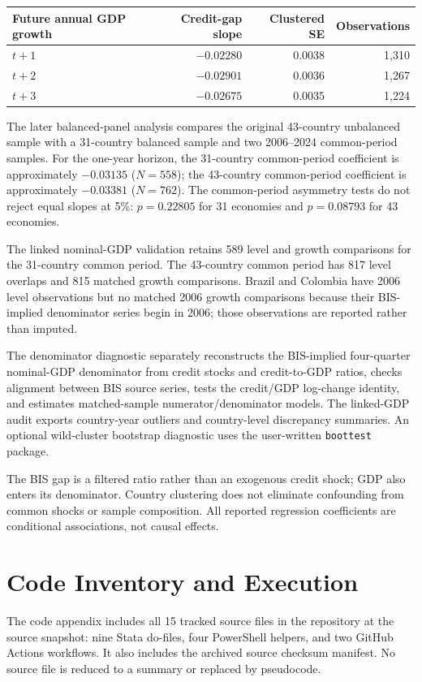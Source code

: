 \documentclass[10pt]{article}
\begin{document}
\begin{center}
\small
\begin{tabular}{lrrr}
\toprule
Future annual GDP growth & Credit-gap slope & Clustered SE & Observations\\
\midrule
\(t+1\) & \(-0.02280\) & \(0.0038\) & 1,310\\
\(t+2\) & \(-0.02901\) & \(0.0036\) & 1,267\\
\(t+3\) & \(-0.02675\) & \(0.0035\) & 1,224\\
\bottomrule
\end{tabular}
\end{center}

The later balanced-panel analysis compares the original 43-country unbalanced sample with a 31-country balanced sample and two 2006--2024 common-period samples. For the one-year horizon, the 31-country common-period coefficient is approximately \(-0.03135\) (\(N=558\)); the 43-country common-period coefficient is approximately \(-0.03381\) (\(N=762\)). The common-period asymmetry tests do not reject equal slopes at 5\%: \(p=0.22805\) for 31 economies and \(p=0.08793\) for 43 economies.

The linked nominal-GDP validation retains 589 level and growth comparisons for the 31-country common period. The 43-country common period has 817 level overlaps and 815 matched growth comparisons. Brazil and Colombia have 2006 level observations but no matched 2006 growth comparisons because their BIS-implied denominator series begin in 2006; those observations are reported rather than imputed.

The denominator diagnostic separately reconstructs the BIS-implied four-quarter nominal-GDP denominator from credit stocks and credit-to-GDP ratios, checks alignment between BIS source series, tests the credit/GDP log-change identity, and estimates matched-sample numerator/denominator models. The linked-GDP audit exports country-year outliers and country-level discrepancy summaries. An optional wild-cluster bootstrap diagnostic uses the user-written \texttt{boottest} package.

The BIS gap is a filtered ratio rather than an exogenous credit shock; GDP also enters its denominator. Country clustering does not eliminate confounding from common shocks or sample composition. All reported regression coefficients are conditional associations, not causal effects.

\section{Code Inventory and Execution}
The code appendix includes all 15 tracked source files in the repository at the source snapshot: nine Stata do-files, four PowerShell helpers, and two GitHub Actions workflows. It also includes the archived source checksum manifest. No source file is reduced to a summary or replaced by pseudocode.
\end{document}
